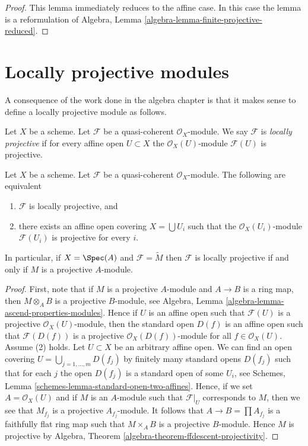 \begin{proof}
This lemma immediately reduces to the affine case.
In this case the lemma is a reformulation of
Algebra, Lemma \ref{algebra-lemma-finite-projective-reduced}.
\end{proof}




\section{Locally projective modules}
\label{section-locally-projective}

\noindent
A consequence of the work done in the algebra chapter is that it
makes sense to define a locally projective module as follows.

\begin{definition}
\label{definition-locally-projective}
Let $X$ be a scheme. Let $\mathcal{F}$ be a quasi-coherent
$\mathcal{O}_X$-module. We say $\mathcal{F}$ is {\it locally projective}
if for every affine open $U \subset X$ the $\mathcal{O}_X(U)$-module
$\mathcal{F}(U)$ is projective.
\end{definition}

\begin{lemma}
\label{lemma-locally-projective}
Let $X$ be a scheme.
Let $\mathcal{F}$ be a quasi-coherent $\mathcal{O}_X$-module.
The following are equivalent
\begin{enumerate}
\item $\mathcal{F}$ is locally projective, and
\item there exists an affine open covering $X = \bigcup U_i$
such that the $\mathcal{O}_X(U_i)$-module
$\mathcal{F}(U_i)$ is projective for every $i$.
\end{enumerate}
In particular, if $X = \Spec(A)$ and $\mathcal{F} = \widetilde{M}$
then $\mathcal{F}$ is locally projective if and only if $M$ is a projective
$A$-module.
\end{lemma}

\begin{proof}
First, note that if $M$ is a projective $A$-module and $A \to B$ is a
ring map, then $M \otimes_A B$ is a projective $B$-module, see
Algebra, Lemma \ref{algebra-lemma-ascend-properties-modules}.
Hence if $U$ is an affine open such that $\mathcal{F}(U)$ is a projective
$\mathcal{O}_X(U)$-module, then the standard open $D(f)$ is an
affine open such that $\mathcal{F}(D(f))$ is a projective
$\mathcal{O}_X(D(f))$-module for all $f \in \mathcal{O}_X(U)$.
Assume (2) holds. Let $U \subset X$ be an arbitrary affine open.
We can find an open covering $U = \bigcup_{j = 1, \ldots, m} D(f_j)$
by finitely many standard opens $D(f_j)$ such that for each
$j$ the open $D(f_j)$ is a standard open of some $U_i$, see
Schemes, Lemma \ref{schemes-lemma-standard-open-two-affines}.
Hence, if we set $A = \mathcal{O}_X(U)$ and if $M$ is an $A$-module
such that $\mathcal{F}|_U$ corresponds to $M$, then we see that
$M_{f_j}$ is a projective $A_{f_j}$-module. It follows that
$A \to B = \prod A_{f_j}$ is a faithfully flat ring map
such that $M \times_A B$ is a projective $B$-module.
Hence $M$ is projective by
Algebra, Theorem \ref{algebra-theorem-ffdescent-projectivity}.
\end{proof}

